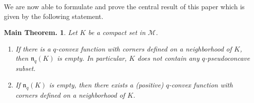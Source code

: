 \documentclass[11pt,a4paper]{article}
\newtheorem*{mthmn}{Main Theorem.}
\newcommand{\Mcal}{\mathcal{M}}
\newcommand{\nuc}{\mathfrak{n}}
\begin{document}
We are now able to formulate and prove the central result of this paper which is given by the following statement. %

\begin{mthmn}\label{main-theorem} Let $K$ be a compact set in $\Mcal$.

\begin{enumerate}

\item If there is a $q$-convex function with corners defined on a neighborhood of $K$, then $\nuc_q(K)$ is empty. In particular, $K$ does not contain any $q$-pseudoconcave subset. 

\item If $\nuc_q(K)$ is empty, then there exists a (positive) $q$-convex function with corners defined on a neighborhood of $K$. 

\end{enumerate}

\end{mthmn}
\end{document}
